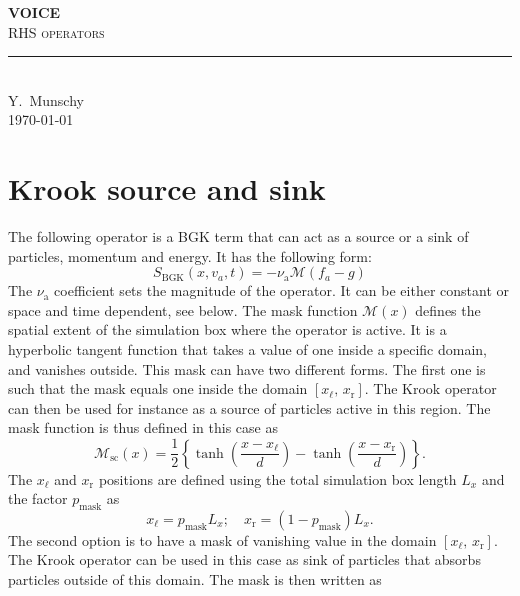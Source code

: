 \documentclass[11pt]{article}
\newcommand{\HRule}[1]{\rule{0.5\linewidth}{#1}}
\begin{document}
\begin{center}

    \LARGE \textbf{\uppercase{VOICE}}
    \vspace{0.8cm}  \\
    \normalsize \textsc{RHS operators} \\	%
    \vspace{0.4cm} 
    \HRule{0.5pt} \\
    \vspace{0.7cm}
    \normalsize Y.~Munschy
    \vspace{0.2cm} \\
    \today
\end{center}


\section{Krook source and sink}
\label{sec:krook_source_and_sink}
The following operator is a BGK term \cite{BGK_Operator} that can act as a source or a sink of particles, momentum and energy. It has the following form:
\[  S_\mathrm{BGK}(x, v_a, t) = - \nu_\mathrm{a} \mathcal{M}\left( f_a - g \right)  \]
The $\nu_\mathrm{a}$ coefficient sets the magnitude of the operator. It can be either constant or space and time dependent, see below. The mask function $\mathcal{M}(x)$ defines the spatial extent of the simulation box where the operator is active. It is a hyperbolic tangent function that takes a value of one inside a specific domain, and vanishes outside. This mask can have two different forms. The first one is such that the mask equals one inside the domain  $\left[ x_\mathrm{\ell}, \, x_\mathrm{r} \right] $.  The Krook operator can then be used for instance as a source of particles active in this region. The mask function is thus defined in this case as
%
\begin{equation}\label{eq:mask_source}
     \mathcal{M}_{\mathrm{sc}}(x) = \dfrac{1}{2}\left\{ \operatorname{tanh}{\left(\dfrac{x-x_\mathrm{\ell}}{d}\right)} - \operatorname{tanh}{\left(\dfrac{x-x_\mathrm{r}}{d}\right)}  \right\} .
\end{equation}
%
The $x_\ell$ and $x_\mathrm{r}$ positions are defined using the total simulation box length $L_x$ and the factor $p_{\mathrm{mask}}$ as
\[ x_\ell = p_{\mathrm{mask}}L_x;\quad x_\mathrm{r} = (1-p_\mathrm{mask}) L_x. \]
The second option is to have a mask of vanishing value in the domain $\left[ x_\mathrm{\ell}, \, x_\mathrm{r} \right] $. The Krook operator can be used in this case as sink of particles that absorbs particles outside of this domain. The mask is then written as
\end{document}
